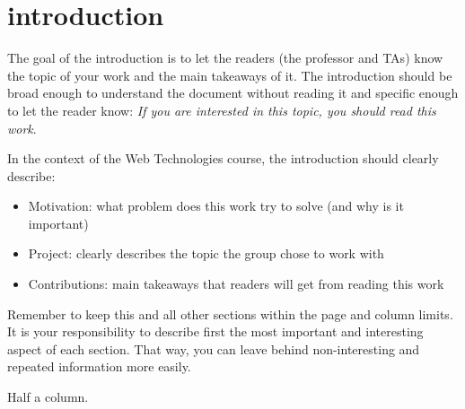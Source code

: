 \section{introduction}

The goal of the introduction is to let the readers (the professor and TAs) know the topic of your work and the main takeaways of it.
The introduction should be broad enough to understand the document without reading it and specific enough to let the reader know: \textit{If you are interested in this topic, you should read this work}.

In the context of the Web Technologies course, the introduction should clearly describe:

\begin{itemize}
    \item Motivation: what problem does this work try to solve (and why is it important)
    \item Project: clearly describes the topic the group chose to work with
    \item Contributions: main takeaways that readers will get from reading this work
\end{itemize}


Remember to keep this and all other sections within the page and column limits.
It is your responsibility to describe first the most important and interesting aspect of each section.
That way, you can leave behind non-interesting and repeated information more easily.

 Half a column.
